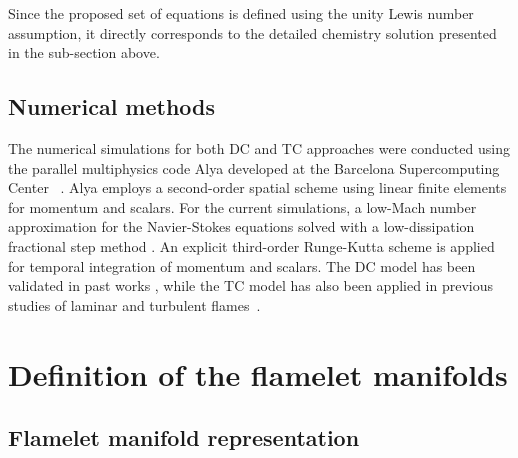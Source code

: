 \documentclass[preprint,12pt,authoryear]{elsarticle}
\begin{document}
Since the proposed set of equations is defined using the unity Lewis number assumption, it directly corresponds to the
detailed chemistry solution presented in the sub-section above.



\subsection{Numerical methods}
\label{sec:numerical_methods}

The numerical simulations for both DC and TC approaches  were conducted using the parallel multiphysics code Alya developed at the Barcelona Supercomputing Center ~\citep{vazquez_alya_2016}. Alya employs a second-order spatial scheme using linear finite elements for momentum and scalars. For the current simulations, a low-Mach number approximation for the Navier-Stokes equations solved with a low-dissipation fractional step method \citep{both_low-dissipation_2020}. An explicit third-order Runge-Kutta scheme is applied for temporal integration of momentum and scalars. The DC model has been validated in past works \citep{surapaneni_assessment_2023}, while the TC model has also been applied in previous studies of laminar and turbulent flames~\citep{govert_effect_2018,pachano_numerical_2023}.




\section{Definition of the flamelet manifolds}
\label{sec:flame_indices_summary}


\subsection{Flamelet manifold representation}
\end{document}
